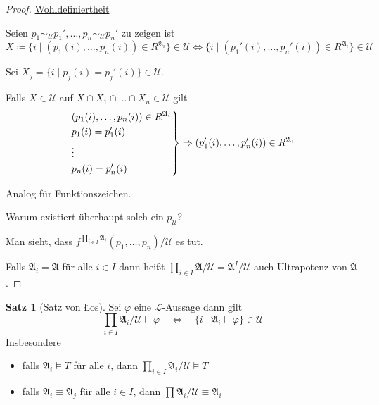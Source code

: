 \documentclass[12pt,parskip=full]{scrartcl}
\newcommand{\heading}{\underline}
\theoremstyle{definition}
\newtheorem{theorem}{Satz}[section]
\begin{document}
	\begin{proof}
		\heading{Wohldefiniertheit}
		
		Seien $p_1 \sim_\mathcal{U} p_1', \dots, p_n \sim_\mathcal{U} p_n'$ zu zeigen ist
		\begin{equation*}
			X \coloneqq \{ i \mid (p_1(i), \dots, p_n(i)) \in R^{\mathfrak{A}_i} \} \in \mathcal{U} \Leftrightarrow \{ i \mid (p_1'(i), \dots, p_n'(i)) \in R^{\mathfrak{A}_i} \} \in \mathcal{U}
		\end{equation*}
		
		Sei $X_j = \{ i \mid p_j(i) = p_j'(i) \} \in \mathcal{U}$.
		
		Falls $X \in \mathcal{U}$ auf $X \cap X_1 \cap \dots \cap X_n \in \mathcal{U}$ gilt
		\begin{equation*}
			\begin{drcases}
				(p_1(i), \dots, p_n(i)) \in R^{\mathfrak{A}_i} \\
				p_1(i) = p_1'(i) \\
				\vdots \\
				p_n(i) = p_n'(i)
			\end{drcases} \Rightarrow (p_1'(i), \dots, p_n'(i)) \in R^{\mathfrak{A}_i}
		\end{equation*}
		
		Analog für Funktionszeichen.
		
		Warum existiert überhaupt solch ein $p_\mathcal{U}$?
		
		Man sieht, dass $f^{\prod_{i \in I} \mathfrak{A}_i} (p_1, \dots, p_n) / \mathcal{U}$ es tut.
		
		Falls $\mathfrak{A}_i = \mathfrak{A}$ für alle $i \in I$ dann heißt $\prod_{i \in I} \mathfrak{A}/\mathcal{U} = \mathfrak{A}^I/\mathcal{U}$ auch Ultrapotenz von $\mathfrak{A}$.
	\end{proof}

	\begin{theorem}[Satz von \L os]
		Sei $\varphi$ eine $\mathcal{L}$-Aussage dann gilt
		\begin{equation*}
			\prod_{i \in I} \mathfrak{A}_i / \mathcal{U} \models \varphi \quad\Leftrightarrow\quad \{ i \mid \mathfrak{A}_i \models \varphi \} \in \mathcal{U}
		\end{equation*}
		Insbesondere 
		\begin{itemize}
			\item falls $\mathfrak{A}_i \models T$ für alle $i$, dann $\prod_{i \in I} \mathfrak{A}_i / \mathcal{U} \models T$
			\item falls $\mathfrak{A}_i \equiv \mathfrak{A}_j$ für alle $i \in I$, dann $\prod \mathfrak{A}_i / \mathcal{U} \equiv \mathfrak{A}_i$
		\end{itemize}
	\end{theorem}
\end{document}
